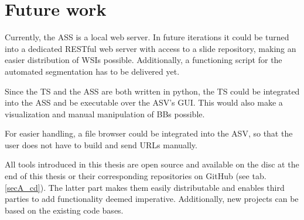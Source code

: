 \section{Future work}
Currently, the ASS is a local web server. In future iterations it could be turned into a dedicated RESTful web server with access to a slide repository, making an easier distribution of WSIs possible. Additionally, a functioning script for the automated segmentation has to be delivered yet.

Since the TS and the ASS are both written in python, the TS could be integrated into the ASS and be executable over the ASV's GUI. This would also make a visualization and manual manipulation of BBs possible.

For easier handling, a file browser could be integrated into the ASV, so that the user does not have to build and send URLs manually.

All tools introduced in this thesis are open source and available on the disc at the end of this thesis or their corresponding repositories on GitHub (see tab. \ref{secA_cd}). The latter part makes them easily distributable and enables third parties to add functionality deemed imperative. Additionally, new projects can be based on the existing code bases.
